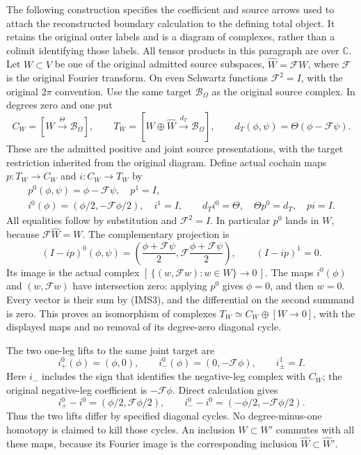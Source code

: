 \documentclass[11pt,a4paper]{article}
\theoremstyle{definition}
\begin{document}
The following construction specifies the coefficient and source arrows
used to attach the reconstructed boundary calculation to the defining
total object.  It retains the original outer labels and is a diagram of
complexes, rather than a colimit identifying those labels.
All tensor products in this paragraph are over \(\mathbb C\).
Let \(W\subset V\) be one of the original admitted source subspaces,
\(\widehat W=\mathcal F W\), where \(\mathcal F\) is the original
Fourier transform.  On even Schwartz functions
\(\mathcal F^2=I\), with the original \(2\pi\) convention.
Use the same target \(\mathscr B_\Omega\) as the original source
complex.  In degrees zero and one put
\[
 C_W=[W\xrightarrow{\Theta}\mathscr B_\Omega],\qquad
 T_W=[W\oplus\widehat W
              \xrightarrow{d_T}\mathscr B_\Omega],\qquad
 d_T(\phi,\psi)=\Theta(\phi-\mathcal F\psi).
 \tag{IMS1}
\]
These are the admitted positive and joint source presentations,
with the target restriction inherited from the original diagram.
Define actual cochain maps \(p:T_W\to C_W\) and \(i:C_W\to T_W\) by
\[
 \begin{gathered}
 p^0(\phi,\psi)=\phi-\mathcal F\psi,\quad p^1=I,\\
 i^0(\phi)=(\phi/2,-\mathcal F\phi/2),\quad i^1=I,\qquad
 d_Ti^0=\Theta,\quad \Theta p^0=d_T,\quad pi=I .
 \end{gathered}\tag{IMS2}
\]
All equalities follow by substitution and \(\mathcal F^2=I\).
In particular \(p^0\) lands in \(W\), because
\(\mathcal F\widehat W=W\).  The complementary projection is
\[
 (I-ip)^0(\phi,\psi)
   =\left(\frac{\phi+\mathcal F\psi}{2},
           \mathcal F\frac{\phi+\mathcal F\psi}{2}\right),
 \qquad (I-ip)^1=0 .
 \tag{IMS3}
\]
Its image is the actual complex
\([\,\{(w,\mathcal Fw):w\in W\}\to0\,]\).
The maps \(i^0(\phi)\) and \((w,\mathcal Fw)\) have intersection zero:
applying \(p^0\) gives \(\phi=0\), and then \(w=0\).
Every vector is their sum by (IMS3), and the differential on the
second summand is zero.  This proves an isomorphism of complexes
\(T_W\simeq C_W\oplus[W\to0]\), with the displayed maps and no
removal of its degree-zero diagonal cycle.

The two one-leg lifts to the same joint target are
\[
 i_+^0(\phi)=(\phi,0),\qquad
 i_-^0(\phi)=(0,-\mathcal F\phi),\qquad i_\pm^1=I .
 \tag{IMS4}
\]
Here \(i_-\) includes the sign that identifies the negative-leg
complex with \(C_W\); the original negative-leg coefficient is
\(-\mathcal F\phi\).  Direct calculation gives
\[
 i_+^0-i^0=(\phi/2,\mathcal F\phi/2),\qquad
 i_-^0-i^0=(-\phi/2,-\mathcal F\phi/2).
 \tag{IMS5}
\]
Thus the two lifts differ by specified diagonal cycles.  No
degree-minus-one homotopy is claimed to kill those cycles.
An inclusion \(W\subset W'\) commutes with all these maps, because
its Fourier image is the corresponding inclusion
\(\widehat W\subset\widehat W'\).
\end{document}
